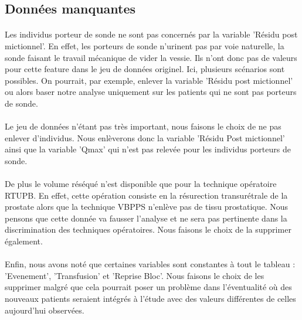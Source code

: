 \documentclass[11pt]{article}
\begin{document}
    \subsection{Données manquantes}\label{donnuxe9es-manquantes}

\paragraph{}
    Les individus porteur de sonde ne sont pas concernés par la variable
'Résidu post mictionnel'. En effet, les porteurs de sonde n'urinent pas
par voie naturelle, la sonde faisant le travail mécanique de vider la
vessie. Ils n'ont donc pas de valeurs pour cette feature dans le jeu de
données originel. Ici, plusieurs scénarios sont possibles. On pourrait,
par exemple, enlever la variable 'Résidu post mictionnel' ou alors baser
notre analyse uniquement sur les patients qui ne sont pas porteurs de
sonde.

\paragraph{}
Le jeu de données n'étant pas très important, nous faisons le choix de
ne pas enlever d'individus. Nous enlèverons donc la variable 'Résidu
Post mictionnel' ainsi que la variable 'Qmax' qui n'est pas relevée pour
les individus porteurs de sonde.

\paragraph{}
De plus le volume réséqué n'est disponible que pour la technique
opératoire RTUPB. En effet, cette opération consiste en la résurection
transurétrale de la prostate alors que la technique VBPPS n'enlève pas
de tissu prostatique. Nous pensons que cette donnée va fausser l'analyse
et ne sera pas pertinente dans la discrimination des techniques
opératoires. Nous faisons le choix de la supprimer également.

\paragraph{}
Enfin, nous avons noté que certaines variables sont constantes à tout le
tableau : 'Evenement', 'Transfusion' et 'Reprise Bloc'. Nous faisons le
choix de les supprimer malgré que cela pourrait poser un problème dans
l'éventualité où des nouveaux patients seraient intégrés à l'étude avec
des valeurs différentes de celles aujourd'hui observées.
\end{document}
